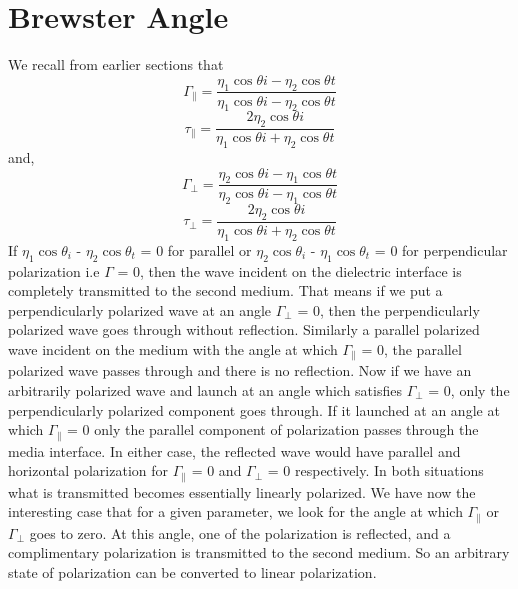 \section{Brewster Angle}
We recall from earlier sections that 
\begin{equation}
\Gamma_\parallel = \dfrac{\eta_1\cos\textit{$\theta$i} - \eta_2\cos\textit{$\theta$t}}  {\eta_1\cos\textit{$\theta$i} - \eta_2\cos\textit{$\theta$t}}
\end{equation}
\begin{equation}
\tau_\parallel = \dfrac{2\eta_2\cos\textit{$\theta$i}} {\eta_1\cos\textit{$\theta$i} + \eta_2\cos\textit{$\theta$t}}
\end{equation}
and,
\begin{equation}
\Gamma_\perp = \dfrac{\eta_2\cos\textit{$\theta$i} - \eta_1\cos\textit{$\theta$t}}  {\eta_2\cos\textit{$\theta$i} - \eta_1\cos\textit{$\theta$t}}
\end{equation}
\begin{equation}
\tau_\perp = \dfrac{2\eta_2\cos\textit{$\theta$i}} {\eta_1\cos\textit{$\theta$i} + \eta_2\cos\textit{$\theta$t}}
\end{equation}
If $\eta_1\cos\theta_{\textit{i}}$ - $\eta_2\cos\theta_{\textit{t}}$ = 0  for parallel or $\eta_2\cos\theta_{\textit{i}}$ - $\eta_1\cos\theta_{\textit{t}}$ = 0 for perpendicular polarization i.e $\Gamma$ = 0, then the wave incident on the dielectric interface is completely transmitted to the second medium. That means if we put a perpendicularly polarized wave at an angle $\Gamma_\perp$ = 0, then the perpendicularly polarized wave goes through without reflection. Similarly a parallel polarized wave incident on the medium with the angle at which $\Gamma_{\parallel}$ = 0, the parallel polarized wave passes through and there is no reflection.
Now if we have an arbitrarily polarized wave and launch at an angle which satisfies $\Gamma_\perp$ = 0, only the perpendicularly polarized component goes through. If it launched at an angle at which $\Gamma_\parallel$ = 0 only the parallel component of polarization passes through the media interface. In either case, the reflected wave would have parallel and horizontal polarization for $\Gamma_\parallel$ = 0 and $\Gamma_\perp$ = 0 respectively. In both situations what is transmitted becomes essentially linearly polarized. We have now the interesting case that for a given parameter, we look for the angle at which $\Gamma_\parallel$ or $\Gamma_\perp$ goes to zero. At this angle, one of the polarization is reflected, and a complimentary polarization is transmitted to the second medium. So an arbitrary state of polarization can be converted to linear polarization.

